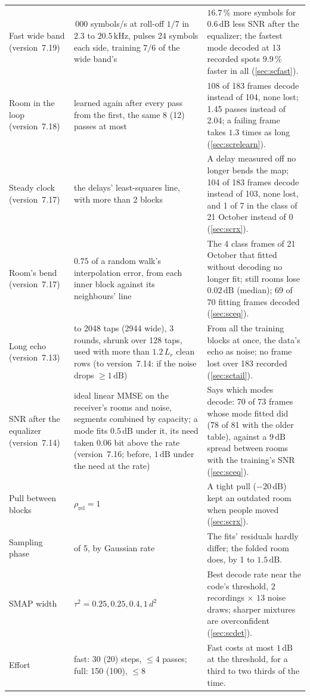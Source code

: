 \documentclass[11pt,a4paper]{article}
\newcommand{\kHz}{\,\mathrm{kHz}}
\newcommand{\dB}{\,\mathrm{dB}}
\theoremstyle{remark}
\begin{document}
\begin{table}[ht]
\begin{tabularx}{\linewidth}{>{\raggedright\arraybackslash}p{3.4cm}>{\raggedright\arraybackslash}p{3.1cm}X}
Fast wide band (version~7.19) & 16\,000 symbols/s at roll-off $1/7$ in $2.3$ to $20.5\kHz$, pulses 24 symbols each side, training $7/6$ of the wide band's & $16.7\,\%$ more symbols for $0.6\dB$ less SNR after the equalizer; the fastest mode decoded at 13 recorded spots $9.9\,\%$ faster in all (\cref{sec:scfast}).\\
Room in the loop (version~7.18) & learned again after every pass from the first, the same 8 (12) passes at most & 108 of 183 frames decode instead of 104, none lost; 1.45 passes instead of 2.04; a failing frame takes $1.3$ times as long (\cref{sec:screlearn}).\\
Steady clock (version~7.17) & the delays' least-squares line, with more than 2 blocks & A delay measured off no longer bends the map; 104 of 183 frames decode instead of 103, none lost, and 1 of 7 in the class of 21 October instead of 0 (\cref{sec:scrx}).\\
Room's bend (version~7.17) & $0.75$ of a random walk's interpolation error, from each inner block against its neighbours' line & The 4 class frames of 21 October that fitted without decoding no longer fit; still rooms lose $0.02\dB$ (median); 69 of 70 fitting frames decoded (\cref{sec:sceq}).\\
Long echo (version~7.13) & to 2048 taps (2944 wide), 3 rounds, shrunk over 128 taps, used with more than $1.2\,L_r$ clean rows (to version~7.14: if the noise drops $\ge 1\dB$) & From all the training blocks at once, the data's echo as noise; no frame lost over 183 recorded (\cref{sec:sctail}).\\
SNR after the equalizer (version~7.14) & ideal linear MMSE on the receiver's rooms and noise, segments combined by capacity; a mode fits $0.5\dB$ under it, its need taken $0.06$ bit above the rate (version~7.16; before, $1\dB$ under the need at the rate) & Says which modes decode: 70 of 73 frames whose mode fitted did (78 of 81 with the older table), against a $9\dB$ spread between rooms with the training's SNR (\cref{sec:sceq}).\\
Pull between blocks & $\rho_{\mathrm{rel}} = 1$ & A tight pull ($-20\dB$) kept an outdated room when people moved (\cref{sec:scrx}).\\
Sampling phase & 1 of 5, by Gaussian rate & The fits' residuals hardly differ; the folded room does, by 1 to $1.5\dB$.\\
SMAP width & $\tau^2 = 0.25, 0.25, 0.4, 1\,d^2$ & Best decode rate near the code's threshold, $2$ recordings $\times$ $13$ noise draws; sharper mixtures are overconfident (\cref{sec:scdet}).\\
Effort & fast: 30 (20) steps, $\le 4$ passes; full: 150 (100), $\le 8$ & Fast costs at most $1\dB$ at the threshold, for a third to two thirds of the time.\\
\bottomrule
\end{tabularx}
\end{table}
\end{document}
